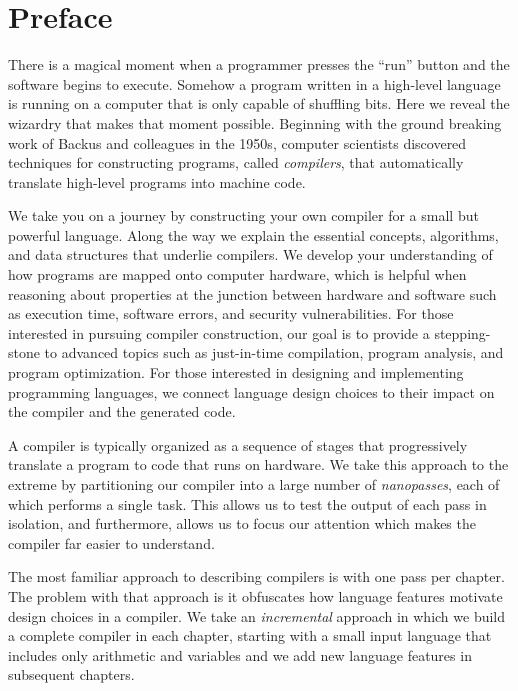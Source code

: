\documentclass[7x10]{TimesAPriori_MIT}%
\begin{document}

\tableofcontents



\chapter*{Preface}

There is a magical moment when a programmer presses the ``run'' button
and the software begins to execute. Somehow a program written in a
high-level language is running on a computer that is only capable of
shuffling bits. Here we reveal the wizardry that makes that moment
possible. Beginning with the ground breaking work of Backus and
colleagues in the 1950s, computer scientists discovered techniques for
constructing programs, called \emph{compilers}, that automatically
translate high-level programs into machine code.

We take you on a journey by constructing your own compiler for a small
but powerful language. Along the way we explain the essential
concepts, algorithms, and data structures that underlie compilers. We
develop your understanding of how programs are mapped onto computer
hardware, which is helpful when reasoning about properties at the
junction between hardware and software such as execution time,
software errors, and security vulnerabilities.  For those interested
in pursuing compiler construction, our goal is to provide a
stepping-stone to advanced topics such as just-in-time compilation,
program analysis, and program optimization.  For those interested in
designing and implementing programming languages, we connect
language design choices to their impact on the compiler and the generated
code.

A compiler is typically organized as a sequence of stages that
progressively translate a program to code that runs on hardware. We
take this approach to the extreme by partitioning our compiler into a
large number of \emph{nanopasses}, each of which performs a single
task. This allows us to test the output of each pass in isolation, and
furthermore, allows us to focus our attention which makes the compiler
far easier to understand.

The most familiar approach to describing compilers is with one pass
per chapter.  The problem with that approach is it obfuscates how
language features motivate design choices in a compiler. We take an
\emph{incremental} approach in which we build a complete compiler in
each chapter, starting with a small input language that includes only
arithmetic and variables and we add new language features in
subsequent chapters.
\end{document}
